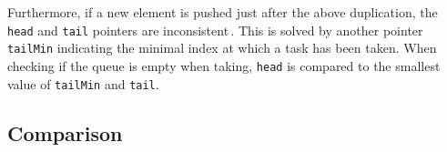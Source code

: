 Furthermore, if a new element is pushed just after the above duplication, the \texttt{head} and \texttt{tail} pointers are inconsistent\,\cite[p. 235]{Leijen:2009:DTP:1639949.1640106}. This is solved by another pointer \texttt{tailMin} indicating the minimal index at which a task has been taken. When checking if the queue is empty when taking, \texttt{head} is compared to the smallest value of \texttt{tailMin} and \texttt{tail}.

\subsection{Comparison}

